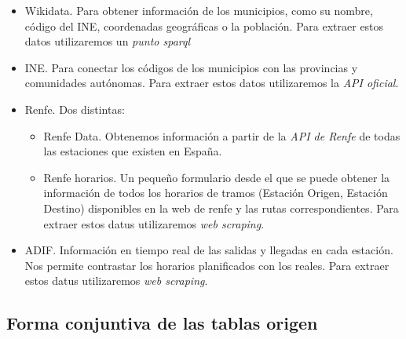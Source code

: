 \begin{itemize}
\tightlist
\item
  Wikidata. Para obtener información de los municipios, como su nombre,
  código del INE, coordenadas geográficas o la población. Para extraer
  estos datos utilizaremos un \emph{punto sparql}
\item
  INE. Para conectar los códigos de los municipios con las provincias y
  comunidades autónomas. Para extraer estos datos utilizaremos la
  \emph{API oficial}.
\item
  Renfe. Dos distintas:

  \begin{itemize}
  \tightlist
  \item
    Renfe Data. Obtenemos información a partir de la \emph{API de Renfe}
    de todas las estaciones que existen en España.
  \item
    Renfe horarios. Un pequeño formulario desde el que se puede obtener
    la información de todos los horarios de tramos (Estación Origen,
    Estación Destino) disponibles en la web de renfe y las rutas
    correspondientes. Para extraer estos datus utilizaremos \emph{web
    scraping}.
  \end{itemize}
\item
  ADIF. Información en tiempo real de las salidas y llegadas en cada
  estación. Nos permite contrastar los horarios planificados con los
  reales. Para extraer estos datus utilizaremos \emph{web scraping}.
\end{itemize}

\subsection{Forma conjuntiva de las tablas
origen}\label{forma-conjuntiva-de-las-tablas-origen}

